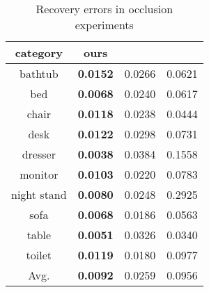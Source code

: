 \documentclass[10pt,twocolumn,letterpaper]{article}
\begin{document}
 \begin{table}[h]
\caption{Recovery errors in occlusion experiments}\label{exp:recovery}
\vspace{-2mm}
\centering
\begin{small}
\begin{tabular}{|c|c|c|c|}
\hline
 category          & ours   & \cite{3dgan}      & \cite{wu20153d}  \\ \hline \hline
bathtub       & \textbf{0.0152} & 0.0266  & 0.0621  \\ \hline
bed   & \textbf{0.0068} & 0.0240  & 0.0617  \\ \hline
chair      & \textbf{0.0118} & 0.0238 & 0.0444 \\ \hline
desk    & \textbf{0.0122} & 0.0298& 0.0731    \\ \hline
dresser & \textbf{0.0038} &  0.0384  & 0.1558 \\ \hline
monitor & \textbf{0.0103} &  0.0220  & 0.0783  \\ \hline
night stand    & \textbf{0.0080} & 0.0248 & 0.2925  \\ \hline
sofa   & \textbf{0.0068} &  0.0186   & 0.0563 \\ \hline 
table    & \textbf{0.0051} & 0.0326 & 0.0340  \\ \hline
toilet   & \textbf{0.0119} & 0.0180 & 0.0977  \\ \hline
\hline
Avg.   & \textbf{0.0092} &  0.0259    & 0.0956  \\ \hline
\end{tabular}
\end{small}
\end{table}
\vspace{-2mm}
\end{document}
